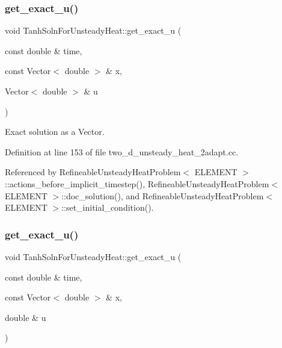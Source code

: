 \subsubsection{\texorpdfstring{get\+\_\+exact\+\_\+u()}{get\_exact\_u()}\hspace{0.1cm}{\footnotesize\ttfamily [1/2]}}
{\footnotesize\ttfamily void Tanh\+Soln\+For\+Unsteady\+Heat\+::get\+\_\+exact\+\_\+u (\begin{DoxyParamCaption}\item[{const double \&}]{time,  }\item[{const Vector$<$ double $>$ \&}]{x,  }\item[{Vector$<$ double $>$ \&}]{u }\end{DoxyParamCaption})}



Exact solution as a Vector. 



Definition at line 153 of file two\+\_\+d\+\_\+unsteady\+\_\+heat\+\_\+2adapt.\+cc.



Referenced by Refineable\+Unsteady\+Heat\+Problem$<$ E\+L\+E\+M\+E\+N\+T $>$\+::actions\+\_\+before\+\_\+implicit\+\_\+timestep(), Refineable\+Unsteady\+Heat\+Problem$<$ E\+L\+E\+M\+E\+N\+T $>$\+::doc\+\_\+solution(), and Refineable\+Unsteady\+Heat\+Problem$<$ E\+L\+E\+M\+E\+N\+T $>$\+::set\+\_\+initial\+\_\+condition().

\mbox{\label{namespaceTanhSolnForUnsteadyHeat_a62871b93b792298dcdade93bde0085ff}} 
\subsubsection{\texorpdfstring{get\+\_\+exact\+\_\+u()}{get\_exact\_u()}\hspace{0.1cm}{\footnotesize\ttfamily [2/2]}}
{\footnotesize\ttfamily void Tanh\+Soln\+For\+Unsteady\+Heat\+::get\+\_\+exact\+\_\+u (\begin{DoxyParamCaption}\item[{const double \&}]{time,  }\item[{const Vector$<$ double $>$ \&}]{x,  }\item[{double \&}]{u }\end{DoxyParamCaption})}



